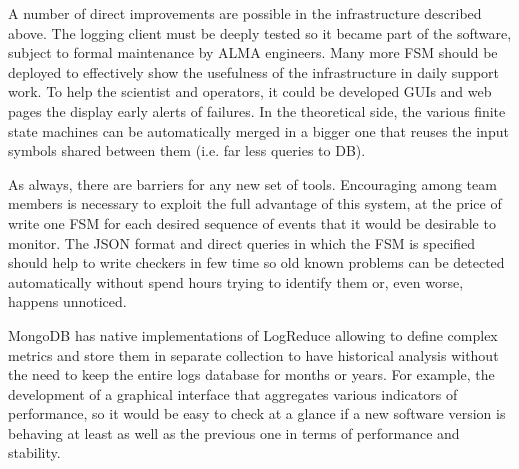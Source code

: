 \documentclass[]{spie}  %
\begin{document}
A number of direct improvements are possible in the infrastructure described
above. The logging client must be deeply tested so it became part of the
software, subject to formal maintenance by ALMA engineers. Many more FSM should
be deployed to effectively show the usefulness of the infrastructure in daily
support work. To help the scientist and operators, it could be developed GUIs
and web pages the display early alerts of failures. In the theoretical side,
    the various finite state machines can be automatically merged in a bigger
    one that reuses the input symbols shared between them (i.e. far less
            queries to DB). 

As always, there are barriers for any new set of tools. Encouraging among team
members is necessary to exploit the full advantage of this system, at the price
of write one FSM for each desired sequence of events that it would be desirable
to monitor. The JSON format and direct queries in which the FSM is specified
should help to write checkers in few time so old known problems can be detected
automatically without spend hours trying to identify them or, even worse,
              happens unnoticed.

MongoDB has native implementations of LogReduce allowing to define complex
metrics and store them in separate collection to have historical analysis
without the need to keep the entire logs database for months or years. For
example, the development of a graphical interface that aggregates various
indicators of performance, so it would be easy to check at a glance if a new
software version is behaving at least as well as the previous one in terms of
performance and stability.
 

\end{document}
